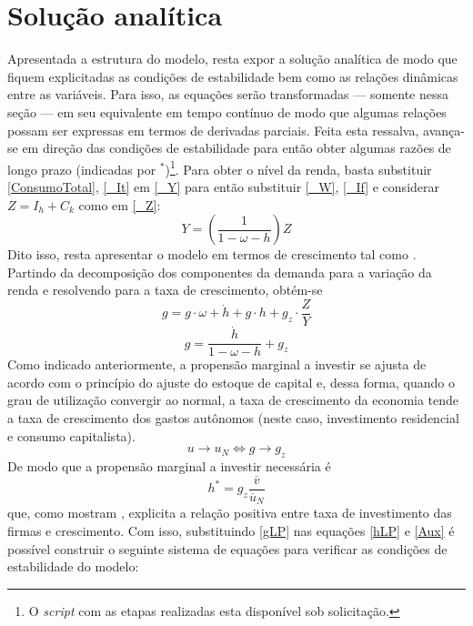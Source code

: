 \section{Solução analítica}
\label{SecAnalitica}

Apresentada a estrutura do modelo, resta expor a solução analítica de modo que fiquem explicitadas as condições de estabilidade bem como as relações dinâmicas entre as variáveis. 
Para isso, as equações serão transformadas --- somente nessa seção --- em seu equivalente em tempo contínuo de modo que algumas relações possam ser expressas em termos de derivadas parciais.
Feita esta ressalva, avança-se em direção das condições de estabilidade para então obter algumas razões de longo prazo (indicadas por $^*$)\footnote{O \textit{script} com as etapas realizadas esta disponível sob solicitação.}.
Para obter o nível da renda, basta substituir \ref{ConsumoTotal}, \ref{_It} em \ref{_Y} para então substituir \ref{_W}, \ref{_If} e considerar $Z = I_h + C_k$ como em \ref{_Z}:
\begin{equation}
    \label{AnaliticaNivel}
    Y = \left(\frac{1}{1-\omega - h}\right)Z
\end{equation}
Dito isso, resta apresentar o modelo em termos de crescimento tal como \textcite{freitas_growth_2015}. Partindo da decomposição dos componentes da demanda para a variação da renda e resolvendo para a taxa de crescimento, obtém-se
$$
g = g\cdot \omega + \dot h + g\cdot h + g_z\cdot \frac{Z}{Y}
$$
\begin{equation}
\label{gLP}
    g = \frac{\dot h}{1 - \omega - h} + g_z
\end{equation}
Como indicado anteriormente, a propensão marginal a investir se ajusta de acordo com o princípio do ajuste do estoque de capital e, dessa forma, quando o grau de utilização convergir ao normal, a taxa de crescimento da economia tende a taxa de crescimento dos gastos autônomos (neste caso, investimento residencial e consumo capitalista). 
\begin{equation}
u \to u_N \Leftrightarrow g \to g_z
\end{equation}
De modo que a propensão marginal a investir necessária é
\begin{equation}
\label{hLP}
h^* = g_z\frac{\overline v}{\overline u_N}
\end{equation}
que, como mostram \textcite{fagundes_role_2017}, explicita a relação positiva entre taxa de investimento das firmas e crescimento. Com isso, substituindo \ref{gLP} nas equações \ref{hLP} e \ref{Aux} é possível construir o seguinte sistema de equações para verificar as condições de estabilidade do modelo:

